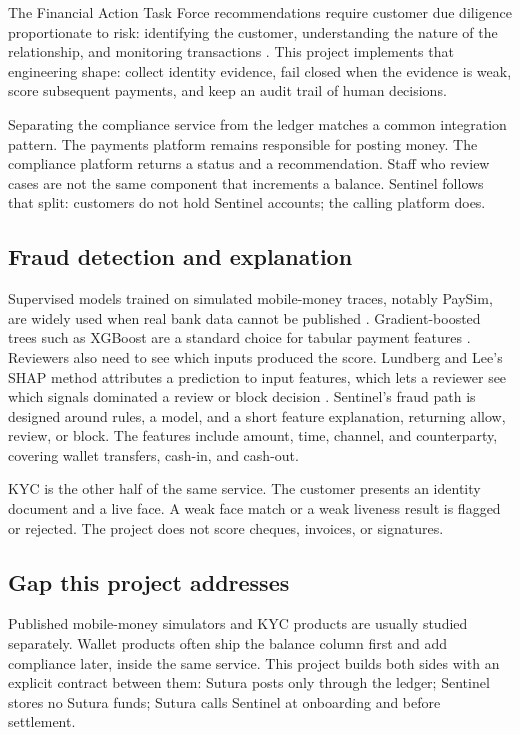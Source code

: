 \documentclass[12pt,a4paper]{article}
\begin{document}
The Financial Action Task Force recommendations require customer due diligence proportionate to risk: identifying the customer, understanding the nature of the relationship, and monitoring transactions \cite{fatf}. This project implements that engineering shape: collect identity evidence, fail closed when the evidence is weak, score subsequent payments, and keep an audit trail of human decisions.

Separating the compliance service from the ledger matches a common integration pattern. The payments platform remains responsible for posting money. The compliance platform returns a status and a recommendation. Staff who review cases are not the same component that increments a balance. Sentinel follows that split: customers do not hold Sentinel accounts; the calling platform does.

\subsection{Fraud detection and explanation}

Supervised models trained on simulated mobile-money traces, notably PaySim, are widely used when real bank data cannot be published \cite{paysim2016}. Gradient-boosted trees such as XGBoost are a standard choice for tabular payment features \cite{xgboost2016}. Reviewers also need to see which inputs produced the score. Lundberg and Lee's SHAP method attributes a prediction to input features, which lets a reviewer see which signals dominated a review or block decision \cite{lundberg2017}. Sentinel's fraud path is designed around rules, a model, and a short feature explanation, returning allow, review, or block. The features include amount, time, channel, and counterparty, covering wallet transfers, cash-in, and cash-out.

KYC is the other half of the same service. The customer presents an identity document and a live face. A weak face match or a weak liveness result is flagged or rejected. The project does not score cheques, invoices, or signatures.

\subsection{Gap this project addresses}

Published mobile-money simulators and KYC products are usually studied separately. Wallet products often ship the balance column first and add compliance later, inside the same service. This project builds both sides with an explicit contract between them: Sutura posts only through the ledger; Sentinel stores no Sutura funds; Sutura calls Sentinel at onboarding and before settlement.
\end{document}
